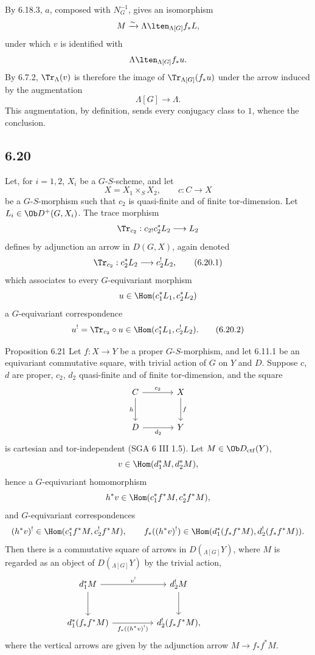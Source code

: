 By 6.18.3, $a$, composed with $N_G^{-1}$, gives an isomorphism
\[
M\xrightarrow{\sim}\Lambda\lten_{\Lambda[G]}f_*L,
\]
under which $v$ is identified with
\[
\Lambda\lten_{\Lambda[G]}f_*u.
\]
By 6.7.2, $\Tr_{\Lambda}(v)$ is therefore the image of $\Tr_{\Lambda[G]}(f_*u)$ under the arrow induced by the augmentation
\[
\Lambda[G]\longrightarrow \Lambda.
\]
This augmentation, by definition, sends every conjugacy class to $1$, whence the conclusion.

\subsection*{6.20}
Let, for $i=1,2$, $X_i$ be a $G$-$S$-scheme, and let
\[
X=X_1\times_SX_2,\qquad c:C\to X
\]
be a $G$-$S$-morphism such that $c_2$ is quasi-finite and of finite tor-dimension. Let $L_i\in\Ob D^+(G,X_i)$. The trace morphism
\[
\Tr_{c_2}:c_{2!}c_2^*L_2\longrightarrow L_2
\]
defines by adjunction an arrow in $D(G,X)$, again denoted
\begin{equation}
\Tr_{c_2}:c_2^*L_2\longrightarrow c_2^!L_2,
\tag{6.20.1}
\end{equation}
which associates to every $G$-equivariant morphism
\[
u\in\Hom(c_1^*L_1,c_2^*L_2)
\]
a $G$-equivariant correspondence
\begin{equation}
u^! = \Tr_{c_2}\circ u\in\Hom(c_1^*L_1,c_2^!L_2).
\tag{6.20.2}
\end{equation}

\begin{statement}{Proposition 6.21}
Let $f:X\to Y$ be a proper $G$-$S$-morphism, and let 6.11.1 be an equivariant commutative square, with trivial action of $G$ on $Y$ and $D$. Suppose $c$, $d$ are proper, $c_2$, $d_2$ quasi-finite and of finite tor-dimension, and the square
\[
\begin{tikzcd}[column sep=large,row sep=large]
C \arrow[r,"c_2"] \arrow[d,"h"'] & X \arrow[d,"f"]\\
D \arrow[r,"d_2"'] & Y
\end{tikzcd}
\]
is cartesian and tor-independent (SGA 6 III 1.5). Let $M\in\Ob D_{\mathrm{ctf}}(Y)$,
\[
v\in\Hom(d_1^*M,d_2^*M),
\]
hence a $G$-equivariant homomorphism
\[
h^*v\in\Hom(c_1^*f^*M,c_2^*f^*M),
\]
and $G$-equivariant correspondences
\[
(h^*v)^!\in\Hom(c_1^*f^*M,c_2^!f^*M),
\qquad
f_*((h^*v)^!)\in\Hom(d_1^*(f_*f^*M),d_2^!(f_*f^*M)).
\]
Then there is a commutative square of arrows in $D({}_{\Lambda[G]}Y)$, where $M$ is regarded as an object of $D({}_{\Lambda[G]}Y)$ by the trivial action,
\[
\begin{tikzcd}[column sep=huge,row sep=large]
d_1^*M \arrow[r,"v^!"] \arrow[d] & d_2^!M \arrow[d] & {}\\
d_1^*(f_*f^*M) \arrow[r,"f_*((h^*v)^!)"'] & d_2^!(f_*f^*M),
\end{tikzcd}
\]
where the vertical arrows are given by the adjunction arrow $M\to f_*f^*M$.
\end{statement}

